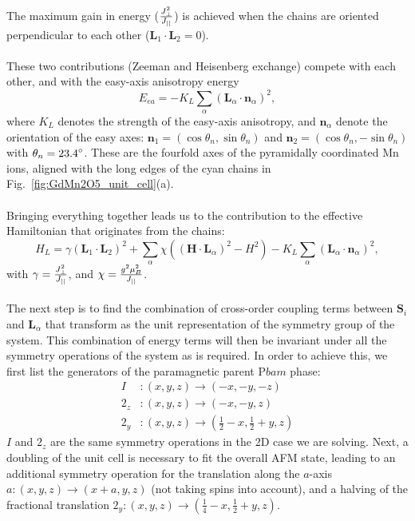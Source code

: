 The maximum gain in energy ($\frac{J_{\perp}^2}{J_{||}}$) is achieved when the chains are oriented perpendicular to each other ($\bm L_1 \cdot \bm L_2 = 0$).
\\\\
These two contributions (Zeeman and Heisenberg exchange) compete with each other, and with the easy-axis anisotropy energy
\begin{equation}
	E_{ea} = -K_L\sum_\alpha(\bm{L}_\alpha\cdot \bm{n}_\alpha)^2,
\end{equation}
where $K_L$ denotes the strength of the easy-axis anisotropy, and $\bm n_\alpha$ denote the orientation of the easy axes:
$\bm{n}_1=\left(\cos\theta_n, \sin\theta_n\right)$ and $\bm{n}_2=\left(\cos\theta_n, -\sin\theta_n\right)$ with $\theta_n = \rm{23.4}^\circ$.
These are the fourfold axes of the pyramidally coordinated Mn ions, aligned with the long edges of the cyan chains in Fig.~\ref{fig:GdMn2O5_unit_cell}(a).
\\\\
Bringing everything together leads us to the contribution to the effective Hamiltonian that originates from the chains:
\begin{equation}
	H_L = \gamma(\bm{L}_1\cdot \bm{L}_2)^2
    +\sum_{\alpha}\chi((\bm{H}\cdot \bm{L}_\alpha)^2-H^2)
    -K_L\sum_\alpha(\bm{L}_\alpha\cdot \bm{n}_\alpha)^2\label{eq:GdMn2O5_hami_1},
\end{equation}
with $\gamma = \frac{J_{\perp}^2}{J_{||}}$, and $\chi = \frac{g^2\mu_B^2}{J_{||}}$. 
\\\\
The next step is to find the combination of cross-order coupling terms between $\bm S_i$ and $\bm L_\alpha$ that transform as the unit representation of the symmetry group of the system.
This combination of energy terms will then be invariant under all the symmetry operations of the system as is required.
In order to achieve this, we first list the generators of the paramagnetic parent P$bam$ phase:
\begin{align}
	I &: (x, y, z) \rightarrow (-x, -y, -z)\\
	2_z &: (x, y, z) \rightarrow (-x, -y, z)\\
	2_y &: (x, y, z) \rightarrow (\frac{1}{2} - x, \frac{1}{2} + y, z)
\end{align}
$I$ and $2_z$ are the same symmetry operations in the 2D case we are solving.
Next, a doubling of the unit cell is necessary to fit the overall AFM state, leading to an additional symmetry operation for the translation along the $a$-axis $a: (x, y, z) \rightarrow (x + a, y, z)$ (not taking spins into account), and a halving of the fractional translation $2_y: (x, y, z) \rightarrow (\frac{1}{4} - x, \frac{1}{2}+y, z)$.
